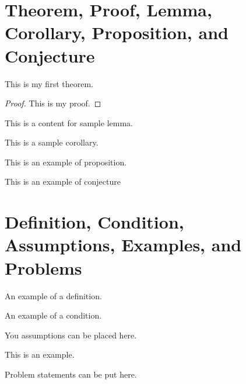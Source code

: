 \section{Theorem, Proof, Lemma, Corollary, Proposition, and Conjecture}
\label{sec:theorem}
\begin{theorem}
  \label{thm:th1}
  This is my first theorem.
\end{theorem}

\begin{proof}
  \label{prf:pr1}
  This is my proof.
\end{proof}

\begin{lemma}
  \label{lem:lem1}
  This is a content for sample lemma. 
\end{lemma}

\begin{corollary}
  \label{cor:cor1}
  This is a sample corollary.
\end{corollary}

\begin{proposition}
  \label{prp:prop1}
  This is an example of proposition.
\end{proposition}

\begin{conjecture}
  \label{cnj:conj1}
  This is an example of conjecture
\end{conjecture}

\section{Definition, Condition, Assumptions, Examples, and Problems}
\label{sec:defn}

\begin{definition}
  \label{def:defn1}
  An example of a definition.
\end{definition}

\begin{condition}
  \label{con:cond1}
  An example of a condition.
\end{condition}

\begin{assumption}
  \label{asm:assum1}
  You assumptions can be placed here.
\end{assumption}

\begin{example}
  \label{exm:example1}
  This is an example.
\end{example}

\begin{problem}
\label{pbl:problem1}
Problem statements can be put here.
\end{problem}


